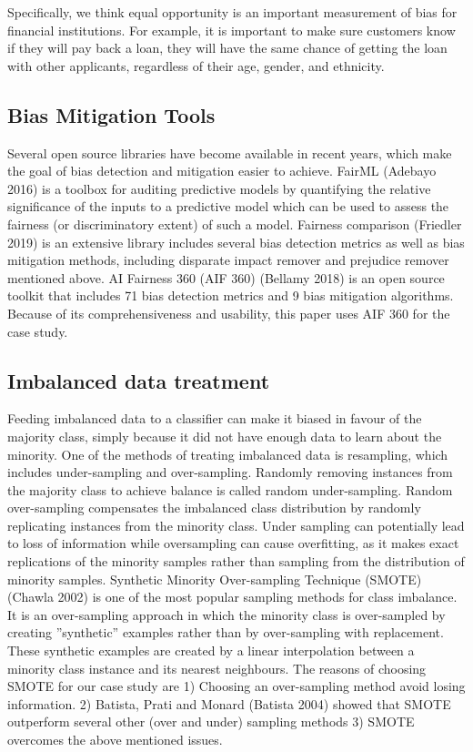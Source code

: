 \documentclass{article}
\begin{document}
Specifically, we think equal opportunity is an important measurement of bias for financial institutions. For example, it is important to make sure customers know if they will pay back a loan, they will have the same chance of getting the loan with other applicants, regardless of their age, gender, and ethnicity.
\subsection{Bias Mitigation Tools}

Several open source libraries have become available in recent years, which make the goal of bias detection and mitigation easier to achieve. FairML (Adebayo 2016) is a toolbox for auditing predictive models by quantifying the relative significance of the inputs to a predictive model which can be used to assess the fairness (or discriminatory extent) of such a model. Fairness comparison (Friedler 2019) is an extensive library includes several bias detection metrics as well as bias mitigation methods, including disparate impact remover and prejudice remover mentioned above. AI Fairness 360 (AIF 360) (Bellamy 2018) is an open source toolkit that includes 71 bias detection metrics and 9 bias mitigation algorithms. Because of its comprehensiveness and usability, this paper uses AIF 360 for the case study.

\subsection{Imbalanced data treatment}
Feeding imbalanced data to a classifier can make it biased in favour of the majority class, simply because it did not have enough data to learn about the minority. 
One of the methods of treating imbalanced data is resampling, which includes under-sampling and over-sampling. Randomly removing instances from the majority class to achieve balance is called random under-sampling. Random over-sampling compensates the imbalanced class distribution by randomly replicating instances from the minority class. Under sampling can potentially lead to loss of information while oversampling can cause overfitting, as it makes exact replications of the minority samples rather than sampling from the distribution of minority samples. Synthetic Minority Over-sampling Technique (SMOTE) (Chawla 2002) is one of the most popular sampling methods for class imbalance. It is an over-sampling approach in which the minority class is over-sampled by creating ''synthetic'' examples rather than by over-sampling with replacement. These synthetic examples are created by a linear interpolation between a minority class instance and its nearest neighbours. 
The reasons of choosing SMOTE for our case study are 1) Choosing an over-sampling method avoid losing information. 2) Batista, Prati and Monard (Batista 2004) showed that SMOTE outperform several other (over and under) sampling methods 3) SMOTE overcomes the above mentioned issues.
\end{document}
